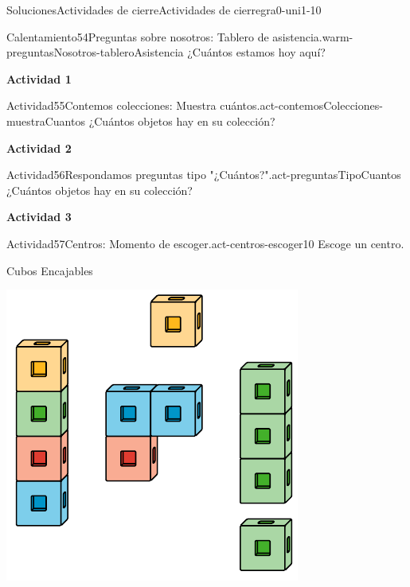 \documentclass[twoside,10pt,]{article}
\begin{document}
\begin{solutions-section}{Soluciones}{Actividades de cierre}{}{Actividades de cierre}{}{}{gra0-uni1-10}
\begin{explorationsolution}{Calentamiento}{54}{Preguntas sobre nosotros: Tablero de asistencia.}{warm-preguntasNosotros-tableroAsistencia}
¿Cuántos estamos hoy aquí?%
\end{explorationsolution}%
\par\medskip
\noindent\textbf{\large{}\space\textperiodcentered\space{}Actividad 1}
\begin{activitysolution}{Actividad}{55}{Contemos colecciones: Muestra cuántos.}{act-contemosColecciones-muestraCuantos}%
¿Cuántos objetos hay en su colección?%
\end{activitysolution}%
\par\medskip
\noindent\textbf{\large{}\space\textperiodcentered\space{}Actividad 2}
\begin{activitysolution}{Actividad}{56}{Respondamos preguntas tipo "¿Cuántos?".}{act-preguntasTipoCuantos}%
¿Cuántos objetos hay en su colección?%
\end{activitysolution}%
\par\medskip
\noindent\textbf{\large{}\space\textperiodcentered\space{}Actividad 3}
\begin{activitysolution}{Actividad}{57}{Centros: Momento de escoger.}{act-centros-escoger10}%
Escoge un centro.%
\begin{sidebyside}{2}{0.025}{0.025}{0.05}%
\begin{sbspanel}{0.45}%
Cubos Encajables%
\par
\includegraphics[width=\linewidth]{external/svg-source/tikz-file-128850.pdf}

\end{sbspanel}
\end{sidebyside}
\end{activitysolution}
\end{solutions-section}
\end{document}
